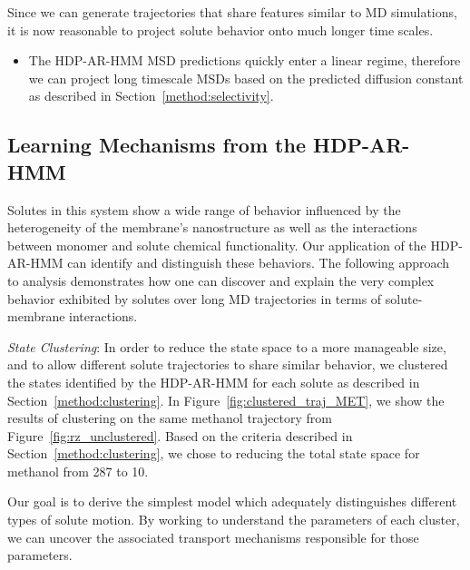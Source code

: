 \documentclass[journal=jpcbfk,manuscript=article]{achemso}
\newcommand{\nclusters}{10}
\begin{document}
  Since we can generate trajectories that share features similar to MD simulations, 
  it is now reasonable to project solute behavior onto much longer time scales.
  \begin{itemize}
    \item The HDP-AR-HMM MSD predictions quickly enter a linear regime, therefore we can 
    project long timescale MSDs based on the predicted diffusion constant as described
    in Section~\ref{method:selectivity}.
  \end{itemize}  
  
  
  
  \subsection{Learning Mechanisms from the HDP-AR-HMM}\label{section:mechanisms}
  
  Solutes in this system show a wide range of behavior influenced by the 
  heterogeneity of the membrane's nanostructure as well as the interactions 
  between monomer and solute chemical functionality. Our application of the 
  HDP-AR-HMM can identify and distinguish these behaviors. The following approach 
  to analysis demonstrates how one can discover and explain the very complex
  behavior exhibited by solutes over long MD trajectories in terms of 
  solute-membrane interactions.
  
  \textit{State Clustering}: In order to reduce the state space to a more 
  manageable size, and to allow different solute trajectories to share 
  similar behavior, we clustered the states identified by the HDP-AR-HMM for each
  solute as described in Section~\ref{method:clustering}. In 
  Figure~\ref{fig:clustered_traj_MET}, we show the results of clustering on the 
  same methanol trajectory from Figure~\ref{fig:rz_unclustered}. Based on 
  the criteria described in Section~\ref{method:clustering},
  we chose to reducing the total state space for methanol from 287 to \nclusters. 
  
  Our goal is to derive the simplest model which adequately distinguishes
  different types of solute motion. By working to understand the parameters of 
  each cluster, we can uncover the associated transport mechanisms responsible
  for those parameters.
  
\end{document}
